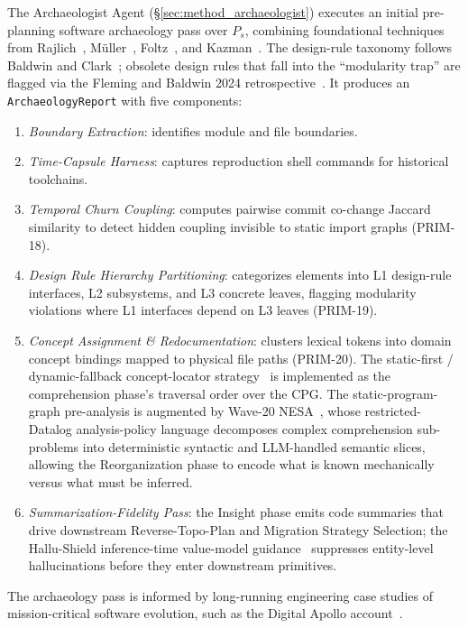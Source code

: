 The Archaeologist Agent (§\ref{sec:method_archaeologist}) executes an
initial pre-planning software archaeology pass over $P_s$, combining
foundational techniques from Rajlich~\cite{p28_weiser},
M\"uller~\cite{p06_codes_bench}, Foltz~\cite{p30_lfm25}, and
Kazman~\cite{p51_kazman_drspaces}. The design-rule taxonomy follows Baldwin
and Clark~\cite{p70_baldwin_clark_design_rules_2006}; obsolete design rules
that fall into the ``modularity trap'' are flagged via the Fleming and Baldwin
2024 retrospective~\cite{p71_fleming_baldwin_arch_complexity_2024}.
It produces an
\texttt{ArchaeologyReport} with five components:
\begin{enumerate}
    \item \emph{Boundary Extraction}: identifies module and file boundaries.
    \item \emph{Time-Capsule Harness}: captures reproduction shell commands for historical toolchains.
    \item \emph{Temporal Churn Coupling}: computes pairwise commit co-change Jaccard similarity to detect hidden coupling invisible to static import graphs (PRIM-18).
    \item \emph{Design Rule Hierarchy Partitioning}: categorizes elements into L1 design-rule interfaces, L2 subsystems, and L3 concrete leaves, flagging modularity violations where L1 interfaces depend on L3 leaves (PRIM-19).
    \item \emph{Concept Assignment \& Redocumentation}: clusters lexical tokens into domain concept bindings mapped to physical file paths (PRIM-20). The static-first / dynamic-fallback concept-locator strategy~\cite{p74_biggerstaff_concept_assignment_1993,p79_wilde_scully_1995} is implemented as the comprehension phase's traversal order over the CPG. The static-program-graph pre-analysis is augmented by Wave-20 NESA~\cite{p142_wang_nesa_2026}, whose restricted-Datalog analysis-policy language decomposes complex comprehension sub-problems into deterministic syntactic and LLM-handled semantic slices, allowing the Reorganization phase to encode what is known mechanically versus what must be inferred.
    \item \emph{Summarization-Fidelity Pass}: the Insight phase emits code summaries that drive downstream Reverse-Topo-Plan and Migration Strategy Selection; the Hallu-Shield inference-time value-model guidance~\cite{p143_wan_hallushield_2026} suppresses entity-level hallucinations before they enter downstream primitives.
\end{enumerate}
The archaeology pass is informed by long-running engineering case
studies of mission-critical software evolution, such as the Digital
Apollo account~\cite{p59_digital_apollo_case}.

